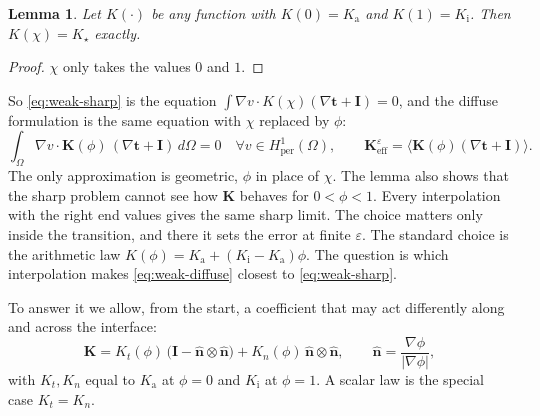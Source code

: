 \documentclass[11pt]{article}
\newtheorem{lemma}{Lemma}
\newcommand{\Om}{\Omega}
\newcommand{\bn}{\hat{\mathbf n}}
\newcommand{\bI}{\mathbf I}
\newcommand{\bt}{\mathbf t}
\newcommand{\bK}{\mathbf K}
\newcommand{\Keff}{\mathbf{K}_{\mathrm{eff}}}
\newcommand{\Ka}{K_{\mathrm a}}
\newcommand{\Ki}{K_{\mathrm i}}
\newcommand{\Kt}{K_{t}}
\newcommand{\Kn}{K_{n}}
\newcommand{\Hper}{H^1_{\mathrm{per}}(\Om)}
\newcommand{\avg}[1]{\big\langle #1 \big\rangle}
\begin{document}
\begin{lemma}\label{lem:any}
Let $K(\cdot)$ be any function with $K(0)=\Ka$ and $K(1)=\Ki$. Then
$K(\chi)=K_\star$ exactly.
\end{lemma}
\begin{proof}
$\chi$ only takes the values $0$ and $1$.
\end{proof}

\noindent So \eqref{eq:weak-sharp} is the equation
$\int\nabla v\cdot K(\chi)(\nabla\bt+\bI)=0$, and the diffuse formulation is the
same equation with $\chi$ replaced by $\phi$:
\begin{equation}
\int_\Om\nabla v\cdot\bK(\phi)\,(\nabla\bt+\bI)\,d\Om=0\quad\forall v\in\Hper,
\qquad \Keff^\varepsilon=\avg{\bK(\phi)(\nabla\bt+\bI)} .
\label{eq:weak-diffuse}
\end{equation}
The only approximation is geometric, $\phi$ in place of $\chi$. The lemma
also shows that the sharp problem cannot see how $\bK$ behaves for
$0<\phi<1$. Every interpolation with the right end values gives the same
sharp limit. The choice matters only inside the transition, and there it sets
the error at finite $\varepsilon$. The standard choice is the arithmetic law
$K(\phi)=\Ka+(\Ki-\Ka)\phi$. The question is which interpolation makes
\eqref{eq:weak-diffuse} closest to \eqref{eq:weak-sharp}.

To answer it we allow, from the start, a coefficient that may act differently
along and across the interface:
\begin{equation}
\bK=\Kt(\phi)\,\big(\bI-\bn\otimes\bn\big)+\Kn(\phi)\,\bn\otimes\bn,
\qquad \bn=\frac{\nabla\phi}{|\nabla\phi|},
\label{eq:Kgeneral}
\end{equation}
with $\Kt,\Kn$ equal to $\Ka$ at $\phi=0$ and $\Ki$ at $\phi=1$. A scalar
law is the special case $\Kt=\Kn$.
\end{document}
